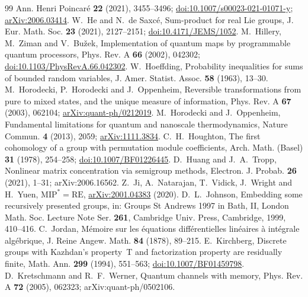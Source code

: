 \begin{thebibliography}{99}
Ann. Henri Poincar\'e \textbf{22} (2021), 3455--3496;
\href{https://doi.org/10.1007/s00023-021-01071-y}{doi:10.1007/s00023-021-01071-y};
\href{https://arxiv.org/abs/2006.03414}{arXiv:2006.03414}.
 W.~He and N.~de Saxc\'e, Sum-product for real Lie groups,
J. Eur. Math. Soc. \textbf{23} (2021), 2127--2151;
\href{https://doi.org/10.4171/JEMS/1052}{doi:10.4171/JEMS/1052}.
 M.~Hillery, M.~Ziman and V.~Bu\v zek, Implementation of quantum maps by programmable quantum
processors, Phys. Rev. A \textbf{66} (2002), 042302; \href{https://doi.org/10.1103/PhysRevA.66.042302}{doi:10.1103/PhysRevA.66.042302}.
 W.~Hoeffding, Probability inequalities for sums of bounded random variables, J. Amer. Statist. Assoc. \textbf{58} (1963), 13--30.
 M.~Horodecki, P.~Horodecki and J.~Oppenheim,
Reversible transformations from pure to mixed states, and the unique measure of information,
Phys. Rev. A \textbf{67} (2003), 062104; \href{https://arxiv.org/abs/quant-ph/0212019}{arXiv:quant-ph/0212019}.
 M.~Horodecki and J.~Oppenheim, Fundamental limitations for quantum and nanoscale thermodynamics,
Nature Commun. \textbf{4} (2013), 2059; \href{https://arxiv.org/abs/1111.3834}{arXiv:1111.3834}.
 C.~H.~Houghton, The first cohomology of a group with permutation module coefficients,
Arch. Math. (Basel) \textbf{31} (1978), 254--258;
\href{https://doi.org/10.1007/BF01226445}{doi:10.1007/BF01226445}.
 D.~Huang and J.~A.~Tropp, Nonlinear matrix concentration via semigroup methods, Electron. J. Probab. \textbf{26} (2021), 1--31;
arXiv:2006.16562.
 Z.~Ji, A.~Natarajan, T.~Vidick, J.~Wright and H.~Yuen,
$\mathrm{MIP}^*=\mathrm{RE}$, \href{https://arxiv.org/abs/2001.04383}{arXiv:2001.04383} (2020).
 D.~L.~Johnson, Embedding some recursively presented groups, in: Groups St Andrews 1997 in Bath, II, London Math. Soc. Lecture Note Ser.
\textbf{261}, Cambridge Univ. Press, Cambridge, 1999, 410--416.
 C.~Jordan, M\'emoire sur les \'equations diff\'erentielles lin\'eaires \`a int\'egrale alg\'ebrique, J. Reine Angew. Math. \textbf{84} (1878),
89--215.
 E.~Kirchberg, Discrete groups with Kazhdan's property~T and factorization property are
residually finite, Math. Ann. \textbf{299} (1994), 551--563;
\href{https://doi.org/10.1007/BF01459798}{doi:10.1007/BF01459798}.
 D.~Kretschmann and R.~F.~Werner, Quantum channels with memory, Phys. Rev. A \textbf{72} (2005), 062323; arXiv:quant-ph/0502106.

\end{thebibliography}
